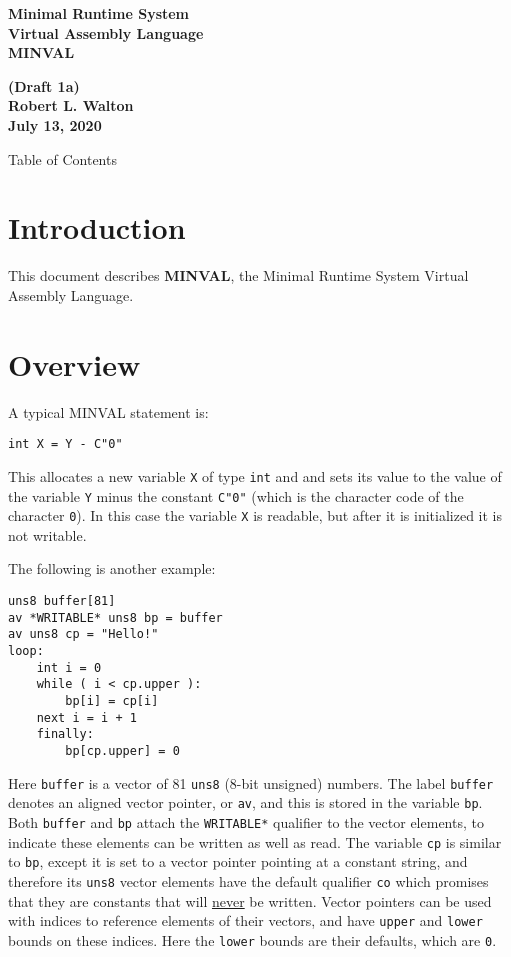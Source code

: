 \documentclass[12pt]{article}
\makeatletter
\renewcommand\tableofcontents{%
    \begin{list}{}%
	     {\setlength{\itemsep}{0in}%
	      \setlength{\topsep}{0in}%
	      \setlength{\parsep}{1ex}%
	      \setlength{\labelwidth}{0in}%
	      \setlength{\baselineskip}{1.5ex}%
	      \setlength{\leftmargin}{0.8in}%
	      \setlength{\rightmargin}{0.8in}}%
    \item\@starttoc{toc}%
    \end{list}}
\newcommand{\key}[1]{{\rm \bfseries #1}}
\newenvironment{indpar}[1][0.3in]%
	{\begin{list}{}%
		     {\setlength{\itemsep}{0in}%
		      \setlength{\topsep}{0in}%
		      \setlength{\parsep}{1ex}%
		      \setlength{\labelwidth}{#1}%
		      \setlength{\leftmargin}{#1}%
		      \addtolength{\leftmargin}{\labelsep}}%
	 \item}%
	{\end{list}}
\makeatother
\begin{document}
        
\begin{center}
\Large \bf
Minimal Runtime System\\
Virtual Assembly Language\\[0.5ex]
\huge \bf
MINVAL
\end{center}
\begin{center}
\large \bf
(Draft 1a)
\\[0.5ex]
Robert L. Walton\\
July 13, 2020

\bigskip
 
Table of Contents
\end{center}

\bigskip

\tableofcontents 

\newpage

\section{Introduction}

This document describes \key{MINVAL}, the Minimal Runtime System Virtual
Assembly Language.

\section{Overview}

A typical MINVAL statement is:
\begin{indpar}\begin{verbatim}
int X = Y - C"0"
\end{verbatim}\end{indpar}
This allocates a new variable {\tt X} of type {\tt int} and
and sets its value to the value of the
variable {\tt Y} minus the constant {\tt C"0"} (which is
the character code of the character {\tt 0}).
In this case the variable {\tt X} is readable, but after it is
initialized it is not writable.

The following is another example:
\begin{indpar}\begin{verbatim}
uns8 buffer[81]
av *WRITABLE* uns8 bp = buffer
av uns8 cp = "Hello!"
loop:
    int i = 0
    while ( i < cp.upper ):
        bp[i] = cp[i]
	next i = i + 1
    finally:
        bp[cp.upper] = 0
\end{verbatim}\end{indpar}

Here {\tt buffer} is a vector of 81 {\tt uns8} (8-bit unsigned) numbers.
The label {\tt buffer} denotes an aligned vector pointer, or {\tt av},
and this is stored in the variable {\tt bp}.  Both {\tt buffer}
and {\tt bp} attach the {\tt *WRITABLE*} qualifier to the vector elements,
to indicate these elements can be written as well as read.
The variable {\tt cp} is
similar to {\tt bp}, except it is set to a vector pointer pointing at
a constant string, and therefore its {\tt uns8} vector elements have
the default qualifier {\tt co} which promises that they are constants that will
\underline{never} be written.  Vector pointers can be used with indices
to reference elements of their vectors, and have {\tt upper} and
{\tt lower} bounds on these indices.  Here the {\tt lower} bounds
are their defaults, which are {\tt 0}.
\end{document}
